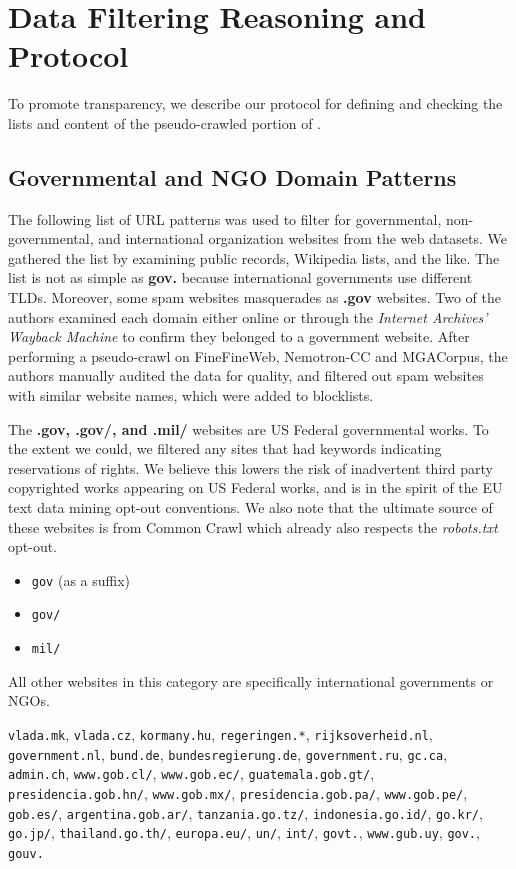 \section{Data Filtering Reasoning and Protocol}
To promote transparency, we describe our protocol for defining and checking the lists and content of the pseudo-crawled portion of \MixtureVitae{}.

\subsection{Governmental and NGO Domain Patterns}
\label{app:gov_domains}
The following list of URL patterns was used to filter for governmental, non-governmental, and international organization websites from the web datasets. We gathered the list by examining public records, Wikipedia lists, and the like. The list is not as simple as \textbf{gov.} because international governments use different TLDs. Moreover, some spam websites masquerades as \textbf{{.gov}} websites. 
Two of the authors examined each domain either online or through the \textit{Internet Archives' Wayback Machine} to confirm they belonged to a government website. After performing a pseudo-crawl on FineFineWeb, Nemotron-CC and MGACorpus, the authors manually audited the data for quality, and filtered out spam websites with similar website names, which were added to blocklists. 

The\textbf{ .gov, .gov/, and .mil/ }websites are US Federal governmental works. To the extent we could, we filtered any sites that had keywords indicating reservations of rights. We believe this lowers the risk of inadvertent third party copyrighted works appearing on US Federal works, and is in the spirit of the EU text data mining opt-out conventions. We also note that the ultimate source of these websites is from Common Crawl which already also respects the \textit{robots.txt} opt-out.
{\footnotesize
\begin{itemize}
    \item  \texttt{gov} (as a suffix)
    \item \texttt{gov/}
    \item \texttt{mil/}
\end{itemize}
}

All other websites in this category are specifically international governments or NGOs. 


{\footnotesize
    \texttt{vlada.mk},
    \texttt{vlada.cz},
    \texttt{kormany.hu},
    \texttt{regeringen.*},
    \texttt{rijksoverheid.nl},
    \texttt{government.nl},
    \texttt{bund.de},
    \texttt{bundesregierung.de},
    \texttt{government.ru},
    \texttt{gc.ca},
    \texttt{admin.ch},
    \texttt{www.gob.cl/},
    \texttt{www.gob.ec/},
    \texttt{guatemala.gob.gt/},
    \texttt{presidencia.gob.hn/},
    \texttt{www.gob.mx/},
    \texttt{presidencia.gob.pa/},
    \texttt{www.gob.pe/},
    \texttt{gob.es/},
    \texttt{argentina.gob.ar/},
    \texttt{tanzania.go.tz/},
    \texttt{indonesia.go.id/},
    \texttt{go.kr/},
    \texttt{go.jp/},
    \texttt{thailand.go.th/},
    \texttt{europa.eu/},
    \texttt{un/},
    \texttt{int/},
    \texttt{govt.},
    \texttt{www.gub.uy},
    \texttt{gov.},
    \texttt{gouv.}
}

